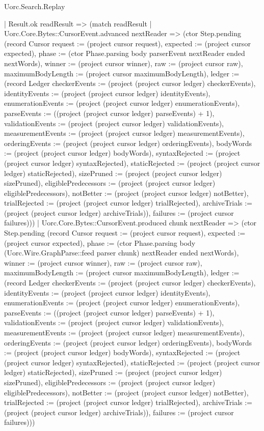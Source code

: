 \begin{lexlean}{Uorc.Search.Replay}
\begin{semanticmodule}
{        | Result.ok readResult => (match readResult
          | Uorc.Core.Bytes::CursorEvent.advanced nextReader => (ctor Step.pending (record Cursor {request := (project cursor request), expected := (project cursor expected), phase := (ctor Phase.parsing body parserEvent nextReader ended nextWords), winner := (project cursor winner), raw := (project cursor raw), maximumBodyLength := (project cursor maximumBodyLength), ledger := (record Ledger {checkerEvents := (project (project cursor ledger) checkerEvents), identityEvents := (project (project cursor ledger) identityEvents), enumerationEvents := (project (project cursor ledger) enumerationEvents), parseEvents := ((project (project cursor ledger) parseEvents) + 1), validationEvents := (project (project cursor ledger) validationEvents), measurementEvents := (project (project cursor ledger) measurementEvents), orderingEvents := (project (project cursor ledger) orderingEvents), bodyWords := (project (project cursor ledger) bodyWords), syntaxRejected := (project (project cursor ledger) syntaxRejected), staticRejected := (project (project cursor ledger) staticRejected), sizePruned := (project (project cursor ledger) sizePruned), eligiblePredecessors := (project (project cursor ledger) eligiblePredecessors), notBetter := (project (project cursor ledger) notBetter), trialRejected := (project (project cursor ledger) trialRejected), archiveTrials := (project (project cursor ledger) archiveTrials)}), failures := (project cursor failures)}))
          | Uorc.Core.Bytes::CursorEvent.produced chunk nextReader => (ctor Step.pending (record Cursor {request := (project cursor request), expected := (project cursor expected), phase := (ctor Phase.parsing body (Uorc.Wire.GraphParse::feed parser chunk) nextReader ended nextWords), winner := (project cursor winner), raw := (project cursor raw), maximumBodyLength := (project cursor maximumBodyLength), ledger := (record Ledger {checkerEvents := (project (project cursor ledger) checkerEvents), identityEvents := (project (project cursor ledger) identityEvents), enumerationEvents := (project (project cursor ledger) enumerationEvents), parseEvents := ((project (project cursor ledger) parseEvents) + 1), validationEvents := (project (project cursor ledger) validationEvents), measurementEvents := (project (project cursor ledger) measurementEvents), orderingEvents := (project (project cursor ledger) orderingEvents), bodyWords := (project (project cursor ledger) bodyWords), syntaxRejected := (project (project cursor ledger) syntaxRejected), staticRejected := (project (project cursor ledger) staticRejected), sizePruned := (project (project cursor ledger) sizePruned), eligiblePredecessors := (project (project cursor ledger) eligiblePredecessors), notBetter := (project (project cursor ledger) notBetter), trialRejected := (project (project cursor ledger) trialRejected), archiveTrials := (project (project cursor ledger) archiveTrials)}), failures := (project cursor failures)}))
}
\end{semanticmodule}
\end{lexlean}
